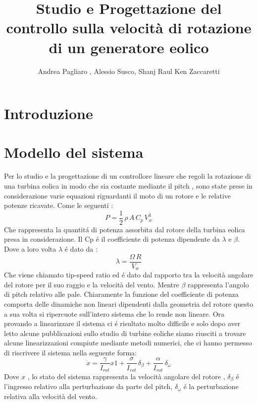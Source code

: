 \documentclass[a4paper,13pt]{article}
\begin{document}
\author{Andrea Pagliaro , Alessio Susco, Shanj Raul Ken Zaccaretti}
\title{Studio e Progettazione del controllo sulla velocità di rotazione di un generatore eolico}
\maketitle
\section{Introduzione}
\section{Modello del sistema}
Per lo studio e la progettazione di un controllore lineare che regoli la rotazione di una turbina eolica in modo che sia costante mediante il pitch , sono state prese in considerazione varie equazioni riguardanti il moto di un rotore e le relative potenze ricavate.
Come le seguenti :
\begin{equation}
P=\frac{1}{2}\,\rho\,A\,C_p\,V_w^3
\end{equation}
Che rappresenta la quantit\'a di potenza assorbita dal rotore della turbina eolica presa in considerazione.
Il Cp \'e il coefficiente di potenza dipendente da $\lambda$ e $\beta$.
Dove a loro volta $\lambda$ \'e dato da :
\begin{equation}
\lambda=\frac{\Omega\,R}{V_w}
\end{equation}
Che viene chiamato tip-speed ratio ed \'e dato dal rapporto tra la velocità angolare
del rotore per il suo raggio e la velocità del vento.
Mentre $\beta$ rappresenta l'angolo di pitch relativo alle pale.
Chiaramente la funzione del coefficiente di potenza comporta delle dinamiche non 
lineari dipendenti dalla geometria del rotore questo a sua volta si ripercuote sull'intero sistema che lo rende non lineare.  
Ora provando a linearizzare il sistema ci \'e risultato molto difficile e solo dopo aver letto alcune pubblicazioni sullo studio di turbine eoliche siamo riusciti a trovare alcune linearizzazioni compiute mediante metodi numerici, che ci hanno permesso di riscrivere il sistema nella seguente forma:
\begin{equation}
\dot{x}=\frac{\gamma}{I_{rot}}x1+\frac{\sigma}{I_{rot}}\,\delta_\beta+\frac{\alpha}{I_{rot}}\,\delta_\omega
\end{equation}
Dove $x$ , lo stato del sistema rappresenta la velocità angolare del rotore ,
$\delta_\beta$ \'e l'ingresso relativo alla perturbazione da parte del pitch,
$\delta_\omega$ \'e la perturbazione relativa alla velocità del vento.
\end{document}
